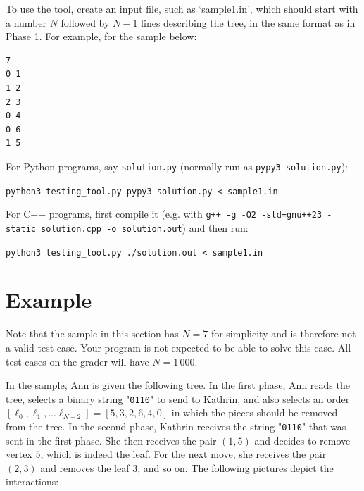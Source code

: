To use the tool, create an input file, such as `sample1.in', which should start with a number $N$ followed by $N-1$ lines describing the tree, in the same format as in Phase 1.
For example, for the sample below:

\begin{verbatim}
7
0 1
1 2
2 3
0 4
0 6
1 5
\end{verbatim}

For Python programs, say \texttt{solution.py} (normally run as \texttt{pypy3 solution.py}):

    \verb|python3 testing_tool.py pypy3 solution.py < sample1.in|

For C++ programs, first compile it
(e.g. with \texttt{g++ -g -O2 -std=gnu++23 -static solution.cpp -o solution.out})
and then run:

    \verb|python3 testing_tool.py ./solution.out < sample1.in|

\section*{Example}
Note that the sample in this section has $N = 7$ for simplicity and is therefore not a valid test case. Your program is not expected to be able to solve this case. All test cases on the grader will have $N = 1\,000$.

In the sample, Ann is given the following tree. In the first phase, Ann reads the tree, selects a binary string "\verb|0110|" to send to Kathrin, and also selects an order $[\ell_0, \ell_1, \ldots \ell_{N-2}] = [5,3,2,6,4,0]$ in which the pieces should be removed from the tree.
In the second phase, Kathrin receives the string "\verb|0110|" that was sent in the first phase. 
She then receives the pair $(1, 5)$ and decides to remove vertex $5$, which is indeed the leaf. 
For the next move, she receives the pair $(2, 3)$ and removes the leaf $3$, and so on.
The following pictures depict the interactions:

